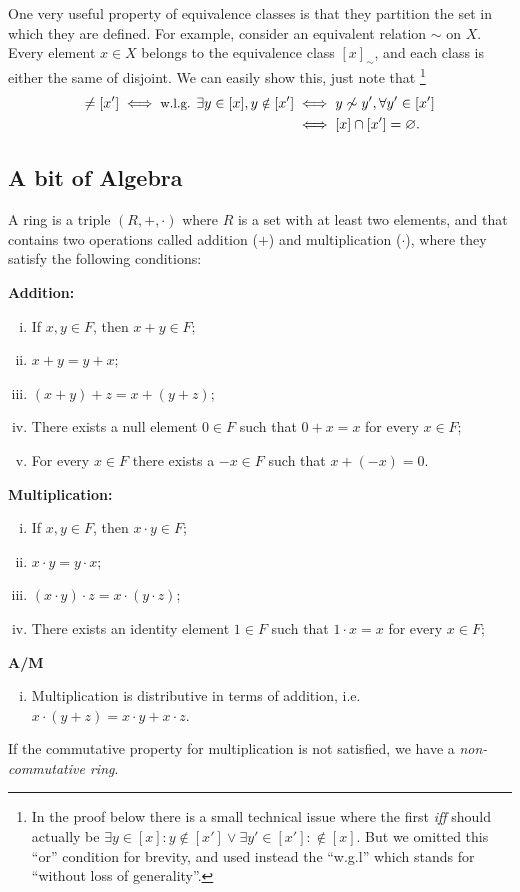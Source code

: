 One very useful property of equivalence classes is that they partition the set in
which they are defined. For example, consider an equivalent relation $\sim$ on $X$.
Every element $x \in X$ belongs to the equivalence class $[x]_{\sim}$, and each
class is either the same of disjoint. We can easily show this, just note that
\footnote{In the proof below there is a small technical issue where the first
\textit{iff} should actually be $\exists y \in [x]: y \notin [x']\vee \exists y'
\in [x']: \notin [x]$. But we omitted this ``or'' condition for brevity, and used
instead the ``w.g.l'' which stands for ``without loss of generality''.}
\begin{align*}
  [x] \neq [x'] \iff \small{\text{w.l.g. }} \exists y \in [x], y \notin [x'] &\iff
y \not \sim y', \forall y' \in [x'] \\
&\iff [x] \cap [x'] = \varnothing.
\end{align*}

\subsection{A bit of Algebra}

\begin{definition}[Ring]
	A ring is a triple $(R, +, \cdot)$ where $R$ is a set with at least two elements,
	and that contains two operations called addition ($+$) and multiplication ($\cdot$),
	where they satisfy the following conditions:

	\textbf{Addition:}
	\begin{enumerate}[(i)]
		\item If $x, y \in F$, then $x+y \in F$;
		\item $x + y = y + x$;
		\item $(x + y) + z = x + (y + z)$;
		\item There exists a null element $0 \in F$ such that $0 + x = x$ for every $x \in F$;
		\item For every $x\in F$ there exists a $-x \in F$ such that $x + (-x) = 0$.
	\end{enumerate}

	\textbf{Multiplication:}
	\begin{enumerate}[(i)]
		\item If $x, y \in F$, then $x\cdot y \in F$;
		\item $x \cdot y = y \cdot x$;
		\item $(x \cdot y) \cdot z = x \cdot (y \cdot z)$;
		\item There exists an identity element $1\in F$ such that $1 \cdot x = x$ for every $x \in F$;
	\end{enumerate}

	\textbf{A/M}
	\begin{enumerate}[(i)]
		\item Multiplication is distributive in terms of addition, i.e.
		      $x\cdot(y+z) = x \cdot y + x \cdot z$.
	\end{enumerate}
	If the commutative property for multiplication is not satisfied, we have a \textit{non-commutative ring}.
\end{definition}

